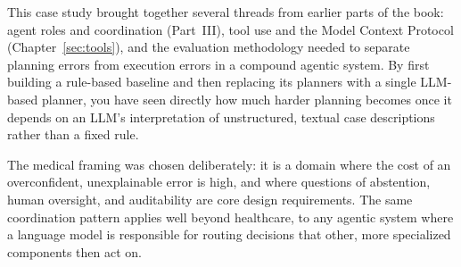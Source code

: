 This case study brought together several threads from earlier parts of the book: agent roles and coordination (Part~III), tool use and the Model Context Protocol (Chapter~\ref{sec:tools}), and the evaluation methodology needed to separate planning errors from execution errors in a compound agentic system. By first building a rule-based baseline and then replacing its planners with a single LLM-based planner, you have seen directly how much harder planning becomes once it depends on an LLM's interpretation of unstructured, textual case descriptions rather than a fixed rule.

The medical framing was chosen deliberately: it is a domain where the cost of an overconfident, unexplainable error is high, and where questions of abstention, human oversight, and auditability are core design requirements. The same coordination pattern applies well beyond healthcare, to any agentic system where a language model is responsible for routing decisions that other, more specialized components then act on.





